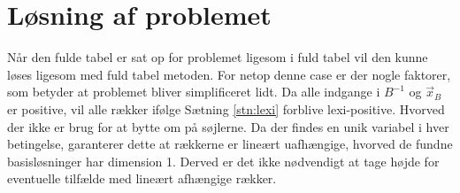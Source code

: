 \section{Løsning af problemet}
Når den fulde tabel er sat op for problemet ligesom i fuld tabel vil den kunne løses ligesom med fuld tabel metoden.
For netop denne case er der nogle faktorer, som betyder at problemet bliver simplificeret lidt.
Da alle indgange i $B^{-1}$ og $\vec{x}_B$ er positive, vil alle rækker ifølge Sætning \ref{stn:lexi} forblive lexi-positive. Hvorved der ikke er brug for at bytte om på søjlerne.
Da der findes en unik variabel i hver betingelse, garanterer dette at rækkerne er lineært uafhængige, hvorved de fundne basisløsninger har dimension 1. Derved er det ikke nødvendigt at tage højde for eventuelle tilfælde med lineært afhængige rækker.












\begin{comment}
\textit{Det vil føre til en matrix på $M+N+1 \times M*N+M+N+1$, så med to af hver => min 6x8}
Dette kan udskrives til følgende hvor der er to opgaver og to ansatte
\begin{align*}
\text{Maximer:}  
L_{1} ( p_{11} +  p_{21}) + L_{2} ( p_{21} +  p_{22}) 
\\\qquad \text{ med hensyn til:}
\\T_1 \leq p_{11} + p_{21} 
\\ T_2 \leq  p_{12} + p_{22}
\\ O_{1} \geq n_{11} p_{11} + n_{12} p_{12}
\\ O_{2} \geq n_{21} p_{21} + n_{21} p_{22}
\\ p_{ij} \geq 0, i,j = 1, 2.
\end{align*}
\end{comment}


















